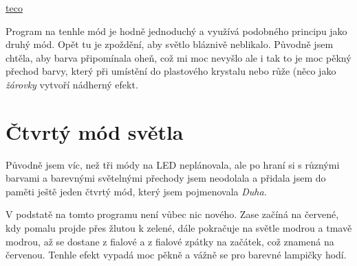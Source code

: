 \href{https://www.tecomat.cz/products/}{teco}

%


Program na tenhle mód je hodně jednoduchý a využívá podobného principu jako druhý mód. Opět tu je zpoždění, aby světlo bláznivě neblikalo. Původně jsem chtěla, aby barva připomínala oheň, což mi moc nevyšlo ale i tak to je moc pěkný přechod barvy, který při umístění do plastového krystalu nebo růže (něco jako \emph{žárovky} vytvoří nádherný efekt. 

\section{Čtvrtý mód světla}
Původně jsem víc, než tři módy na LED neplánovala, ale po hraní si s různými barvami a barevnými světelnými přechody jsem neodolala a přidala jsem do paměti ještě jeden čtvrtý mód, který jsem pojmenovala \emph{Duha}.


%



V podstatě na tomto programu není vůbec nic nového. Zase začíná na červené, kdy pomalu projde přes žlutou k zelené, dále pokračuje na světle modrou a tmavě modrou, až se dostane z fialové a z fialové zpátky na začátek, což znamená na červenou. Tenhle efekt vypadá moc pěkně a vážně se pro barevné lampičky hodí. 



\newpage